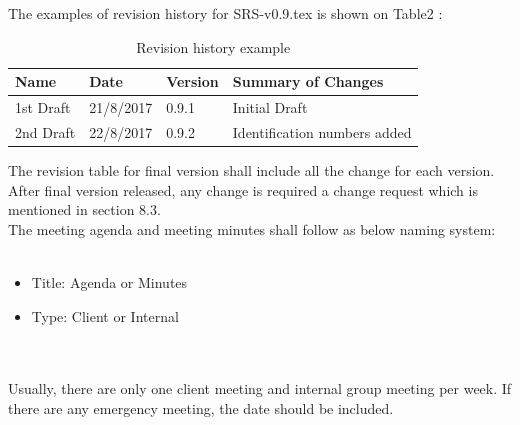 The examples of revision history for SRS-v0.9.tex is shown on Table2 :\\

\begin{table}[]
	\centering
	\caption{Revision history example}
	\label{my-labelxxxx}
	\begin{tabular}{|l|l|l|l|}
		\hline
		Name      & Date      & Version & Summary of Changes           \\ \hline
		1st Draft & 21/8/2017 & 0.9.1   & Initial Draft                \\ \hline
		2nd Draft & 22/8/2017 & 0.9.2   & Identification numbers added \\ \hline
	\end{tabular}
\end{table}


The revision table for final version shall include all the change for each version. After final version released, any change is required a change request which is mentioned in section 8.3.\\


The meeting agenda and meeting minutes shall follow as below naming system:\\
\texttt{}\\
\begin{itemize}
\item Title: Agenda or Minutes
\item Type: Client or Internal
\end{itemize}
\texttt{} \\\\
Usually, there are only one client meeting and internal group meeting per week. If there are any emergency meeting, the date should be included.\\\\
\texttt{}\\
\texttt{}\\

